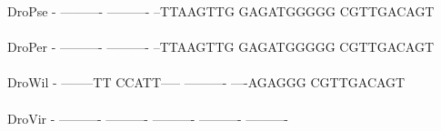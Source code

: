 \documentclass[11pt,twoside,reqno,a4paper]{article}
\begin{document}
{DroPse	-	----------	----------	--TTAAGTTG	GAGATGGGGG	CGTTGACAGT	\\
\hspace*{7\charwidth}\hspace*{1\charwidth}\hspace*{1\charwidth}\hspace*{1\charwidth}\hspace*{1\charwidth}\hspace*{1\charwidth}\hspace*{1\charwidth}\\
DroPer	-	----------	----------	--TTAAGTTG	GAGATGGGGG	CGTTGACAGT	\\
\hspace*{7\charwidth}\hspace*{1\charwidth}\hspace*{1\charwidth}\hspace*{1\charwidth}\hspace*{1\charwidth}\hspace*{1\charwidth}\hspace*{1\charwidth}\\
DroWil	-	--------TT	CCATT-----	----------	----AGAGGG	CGTTGACAGT	\\
\hspace*{7\charwidth}\hspace*{1\charwidth}\hspace*{1\charwidth}\hspace*{1\charwidth}\hspace*{1\charwidth}\hspace*{1\charwidth}\hspace*{1\charwidth}\\
DroVir	-	----------	----------	----------	----------	----------	\\
\hspace*{7\charwidth}\hspace*{1\charwidth}\hspace*{1\charwidth}\hspace*{1\charwidth}\hspace*{1\charwidth}\hspace*{1\charwidth}\hspace*{1\charwidth}\\
\\
}
\end{document}

